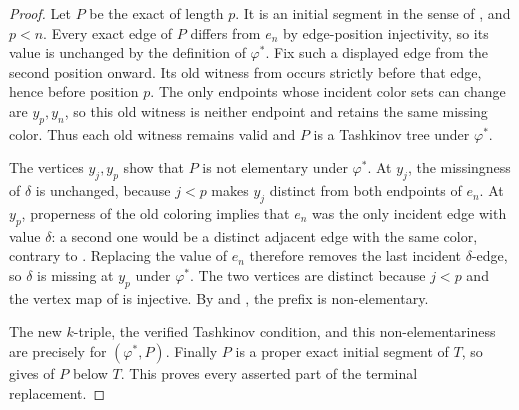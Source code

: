 \begin{proof}
Let \(P\) be the exact  of length \(p\).
It is an initial segment in the sense of
, and \(p<n\).  Every exact edge of
\(P\) differs from \(e_n\) by edge-position injectivity, so its value is
unchanged by the definition of \(\varphi^*\).  Fix such a displayed edge
from the second position onward.  Its old witness from
 occurs strictly before that edge, hence before
position \(p\).  The only endpoints whose incident color sets can change
are \(y_p,y_n\), so this old witness is neither endpoint and retains the
same missing color.  Thus each old witness remains valid and \(P\) is a
Tashkinov tree under \(\varphi^*\).

The vertices \(y_j,y_p\) show that \(P\) is not elementary under
\(\varphi^*\).  At \(y_j\), the missingness of \(\delta\) is unchanged,
because \(j<p\) makes \(y_j\) distinct from both endpoints of \(e_n\).
At \(y_p\), properness of the old coloring implies that \(e_n\) was the
only incident edge with value \(\delta\): a second one would be a
distinct adjacent edge with the same color, contrary to
.  Replacing the value of \(e_n\) therefore
removes the last incident \(\delta\)-edge, so \(\delta\) is missing at
\(y_p\) under \(\varphi^*\).  The two vertices are distinct because
\(j<p\) and the vertex map of  is injective.  By
 and
, the prefix is non-elementary.

The new \(k\)-triple, the verified Tashkinov condition, and this
non-elementariness are precisely  for
\((\varphi^*,P)\).  Finally \(P\) is a proper exact initial segment of
\(T\), so  gives
 of \(P\) below \(T\).  This proves every
asserted part of the terminal replacement.
\end{proof}
